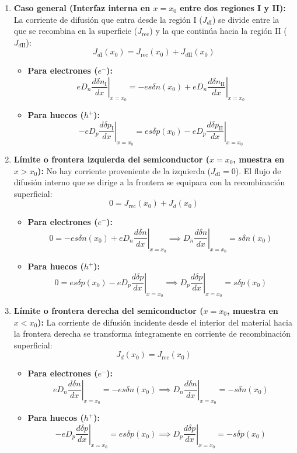 \begin{enumerate}[label=\alph*)]
    \item \textbf{Caso general (Interfaz interna en $x = x_0$ entre dos regiones I y II):}
    La corriente de difusión que entra desde la región I ($J_{d\text{I}}$) se divide entre la que se recombina en la superficie ($J_{\text{rec}}$) y la que continúa hacia la región II ($J_{d\text{II}}$):
    \[
    J_{d\text{I}}(x_0) = J_{\text{rec}}(x_0) + J_{d\text{II}}(x_0)
    \]
    \begin{itemize}
        \item \textbf{Para electrones ($e^-$):}
        \[
        e D_n \left. \frac{d\delta n_{\text{I}}}{dx} \right|_{x=x_0} = -e s \delta n(x_0) + e D_n \left. \frac{d\delta n_{\text{II}}}{dx} \right|_{x=x_0}
        \]
        \item \textbf{Para huecos ($h^+$):}
        \[
        -e D_p \left. \frac{d\delta p_{\text{I}}}{dx} \right|_{x=x_0} = e s \delta p(x_0) - e D_p \left. \frac{d\delta p_{\text{II}}}{dx} \right|_{x=x_0}
        \]
    \end{itemize}

    \item \textbf{Límite o frontera izquierda del semiconductor ($x = x_0$, muestra en $x > x_0$):}
    No hay corriente proveniente de la izquierda ($J_{d\text{I}} = 0$). El flujo de difusión interno que se dirige a la frontera se equipara con la recombinación superficial:
    \[
    0 = J_{\text{rec}}(x_0) + J_d(x_0)
    \]
    \begin{itemize}
        \item \textbf{Para electrones ($e^-$):}
        \[
        0 = -e s \delta n(x_0) + e D_n \left. \frac{d\delta n}{dx} \right|_{x=x_0} \implies D_n \left. \frac{d\delta n}{dx} \right|_{x=x_0} = s \delta n(x_0)
        \]
        \item \textbf{Para huecos ($h^+$):}
        \[
        0 = e s \delta p(x_0) - e D_p \left. \frac{d\delta p}{dx} \right|_{x=x_0} \implies D_p \left. \frac{d\delta p}{dx} \right|_{x=x_0} = s \delta p(x_0)
        \]
    \end{itemize}

    \item \textbf{Límite o frontera derecha del semiconductor ($x = x_0$, muestra en $x < x_0$):}
    La corriente de difusión incidente desde el interior del material hacia la frontera derecha se transforma íntegramente en corriente de recombinación superficial:
    \[
    J_d(x_0) = J_{\text{rec}}(x_0)
    \]
    \begin{itemize}
        \item \textbf{Para electrones ($e^-$):}
        \[
        e D_n \left. \frac{d\delta n}{dx} \right|_{x=x_0} = -e s \delta n(x_0) \implies D_n \left. \frac{d\delta n}{dx} \right|_{x=x_0} = -s \delta n(x_0)
        \]
        \item \textbf{Para huecos ($h^+$):}
        \[
        -e D_p \left. \frac{d\delta p}{dx} \right|_{x=x_0} = e s \delta p(x_0) \implies D_p \left. \frac{d\delta p}{dx} \right|_{x=x_0} = -s \delta p(x_0)
        \]
    \end{itemize}
\end{enumerate}

